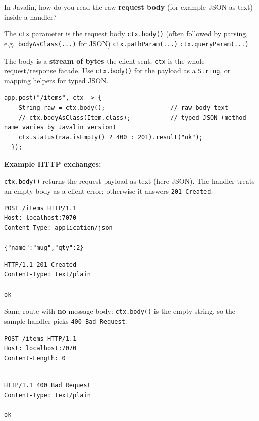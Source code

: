 \question[4]
In Javalin, how do you read the raw \textbf{request body} (for example JSON as text) inside a handler?
\begin{choices}
  \choice The \texttt{ctx} parameter is the request body
  \CorrectChoice \texttt{ctx.body()} (often followed by parsing, e.g.\ \texttt{bodyAsClass(...)} for JSON)
  \choice \texttt{ctx.pathParam(...)}
  \choice \texttt{ctx.queryParam(...)}
\end{choices}
\begin{solution}
  The body is a \textbf{stream of bytes} the client sent; \texttt{ctx} is the whole request/response facade. Use \texttt{ctx.body()} for the payload as a \texttt{String}, or mapping helpers for typed JSON.

  \begin{lstlisting}[style=javaexam]
  app.post("/items", ctx -> {
    String raw = ctx.body();                  // raw body text
    // ctx.bodyAsClass(Item.class);           // typed JSON (method name varies by Javalin version)
    ctx.status(raw.isEmpty() ? 400 : 201).result("ok");
  });
  \end{lstlisting}

  \noindent\textbf{Example HTTP exchanges:}\par
  \noindent \texttt{ctx.body()} returns the request payload as text (here JSON). The handler treats an empty body as a client error; otherwise it answers \texttt{201~Created}.\par
  \begin{httpexchange}
\begin{lstlisting}[style=http]
POST /items HTTP/1.1
Host: localhost:7070
Content-Type: application/json

{"name":"mug","qty":2}
\end{lstlisting}
\httpmidarrows
\begin{lstlisting}[style=http]
HTTP/1.1 201 Created
Content-Type: text/plain

ok
\end{lstlisting}
  \end{httpexchange}

  \noindent Same route with \textbf{no} message body: \texttt{ctx.body()} is the empty string, so the sample handler picks \texttt{400~Bad Request}.\par
  \begin{httpexchange}
\begin{lstlisting}[style=http]
POST /items HTTP/1.1
Host: localhost:7070
Content-Length: 0


\end{lstlisting}
\httpmidarrows
\begin{lstlisting}[style=http]
HTTP/1.1 400 Bad Request
Content-Type: text/plain

ok
\end{lstlisting}
  \end{httpexchange}
\end{solution}

